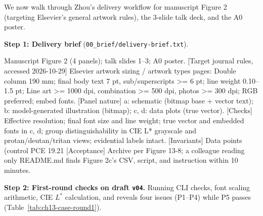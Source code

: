 We now walk through Zhou's delivery workflow for manuscript Figure 2 (targeting Elsevier's general artwork rules), the 3-slide talk deck, and the A0 poster.

\textbf{Step 1: Delivery brief} (\texttt{00\_brief/delivery-brief.txt}).

\begin{Prompt}
[Deliverables] Manuscript Figure 2 (4 panels); talk slides 1--3; A0 poster.
[Target journal rules, accessed 2026-10-29] Elsevier artwork sizing / artwork types pages:
  Double column 190 mm; final body text 7 pt, sub/superscripts >= 6 pt; line weight 0.10--1.5 pt;
  Line art >= 1000 dpi, combination >= 500 dpi, photos >= 300 dpi; RGB preferred; embed fonts.
[Panel nature] a: schematic (bitmap base + vector text); b: model-generated illustration (bitmap); c, d: data plots (true vector).
[Checks] Effective resolution; final font size and line weight; true vector and embedded fonts in c, d;
  group distinguishability in CIE L* grayscale and protan/deutan/tritan views; evidential labels intact.
[Invariants] Data points (control PCE 19.21%
[Acceptance] Archive per Figure 13-8; a colleague reading only README.md finds Figure 2c's CSV, script, and instruction within 10 minutes.
\end{Prompt}

\textbf{Step 2: First-round checks on draft \texttt{v04}.} Running CLI checks, font scaling arithmetic, CIE $L^*$ calculation, and  reveals four issues (P1--P4) while P5 passes (Table~\ref{tab:ch13-case-round1}).

